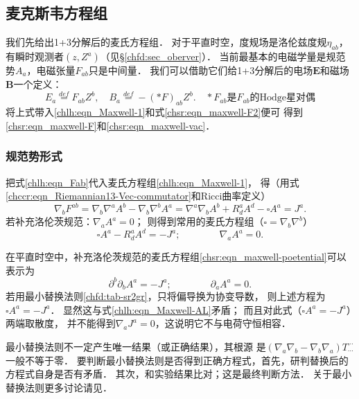 \subsection{麦克斯韦方程组}\label{chlh:sec_maxwell}

我们先给出1+3分解后的麦氏方程组．
对于平直时空，度规场是洛伦兹度规$\eta_{ab}$，有瞬时观测者$(z,Z^a)$（见\S\ref{chfd:sec_oberver}）．
当前最基本的电磁学量是规范势$A_a$，电磁张量$F_{ab}$只是中间量．
我们可以借助它们给1+3分解后的电场$\boldsymbol{E}$和磁场$\boldsymbol{B}$一个定义：
\begin{equation}\label{chlh:eqn_EBdef}
    E_a \overset{def}{=}  F_{ab} Z^b ,\quad
    B_a \overset{def}{=} -(*F)_{ab} Z^b .
    \quad *F_{ab}\text{是} F_{ab} \text{的Hodge星对偶}  %
\end{equation}
将上式带入\eqref{chlh:eqn_Maxwell-1}和式\eqref{chsr:eqn_maxwell-F2}便可
得到\eqref{chsr:eqn_maxwell-F}和\eqref{chsr:eqn_maxwell-vac}．


\subsubsection{规范势形式}\label{chlh:sec_maxA}
把式\eqref{chlh:eqn_Fab}代入麦氏方程组\eqref{chlh:eqn_Maxwell-1}，
得（用式\eqref{chccr:eqn_Riemannian13-Vec-commutator}和Ricci曲率定义）
\begin{equation}
    \nabla_b F^{ab}    = \nabla_b \nabla^a A^b - \nabla_b \nabla^b A^a
    = \nabla^a \nabla_b A^b + R^a_{d}A^d - \square A^a = J^a .
\end{equation}
若补充洛伦茨规范：$\nabla_a A^a =0$；
则得到常用的麦氏方程组（$\square = \nabla_b \nabla^b$）
\begin{equation}\label{chlh:eqn_Maxwell-AL}
    \square A^a - R^a_{d}A^d = -J^a;\qquad\qquad \nabla_a A^a =0.
\end{equation}

在平直时空中，补充洛伦茨规范的麦氏方程组\eqref{chsr:eqn_maxwell-poetential}可以表示为
\begin{equation}
    \partial^b \partial_b A^a = - J^a;\qquad\qquad \partial_a A^a =0.
\end{equation}
若用最小替换法则\ref{chfd:tab-sr2gr}，只将偏导换为协变导数，
则上述方程为$\square A^a  = -J^a $．
显然这与式\eqref{chlh:eqn_Maxwell-AL}矛盾；
而且对此式（$\square A^a  = -J^a $）两端取散度，
并不能得到$\nabla_a J^a=0$，这说明它不与电荷守恒相容．

最小替换法则不一定产生唯一结果（或正确结果），其根源
是$(\nabla_a \nabla_b - \nabla_b \nabla_a)T^{\cdots}_{\cdots}$一般不等于零．
要判断最小替换法则是否得到正确方程式，首先，研判替换后的方程式自身是否有矛盾．
其次，和实验结果比对；这是最终判断方法．
关于最小替换法则更多讨论请见\parencite[\S 16.3]{mtw1973}．


